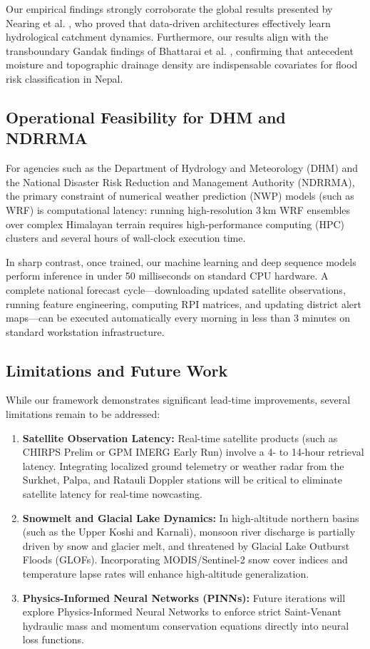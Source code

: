\documentclass[journal]{IEEEtran}
\begin{document}
Our empirical findings strongly corroborate the global results presented by Nearing et al. \cite{nearing2024global}, who proved that data-driven architectures effectively learn hydrological catchment dynamics. Furthermore, our results align with the transboundary Gandak findings of Bhattarai et al. \cite{bhattarai2024leveraging}, confirming that antecedent moisture and topographic drainage density are indispensable covariates for flood risk classification in Nepal.

\subsection{Operational Feasibility for DHM and NDRRMA}
For agencies such as the Department of Hydrology and Meteorology (DHM) and the National Disaster Risk Reduction and Management Authority (NDRRMA), the primary constraint of numerical weather prediction (NWP) models (such as WRF) is computational latency: running high-resolution 3\,km WRF ensembles over complex Himalayan terrain requires high-performance computing (HPC) clusters and several hours of wall-clock execution time. 

In sharp contrast, once trained, our machine learning and deep sequence models perform inference in under 50 milliseconds on standard CPU hardware. A complete national forecast cycle---downloading updated satellite observations, running feature engineering, computing RPI matrices, and updating district alert maps---can be executed automatically every morning in less than 3 minutes on standard workstation infrastructure.

\subsection{Limitations and Future Work}
While our framework demonstrates significant lead-time improvements, several limitations remain to be addressed:
\begin{enumerate}
    \item \textbf{Satellite Observation Latency:} Real-time satellite products (such as CHIRPS Prelim or GPM IMERG Early Run) involve a 4- to 14-hour retrieval latency. Integrating localized ground telemetry or weather radar from the Surkhet, Palpa, and Ratauli Doppler stations will be critical to eliminate satellite latency for real-time nowcasting.
    \item \textbf{Snowmelt and Glacial Lake Dynamics:} In high-altitude northern basins (such as the Upper Koshi and Karnali), monsoon river discharge is partially driven by snow and glacier melt, and threatened by Glacial Lake Outburst Floods (GLOFs). Incorporating MODIS/Sentinel-2 snow cover indices and temperature lapse rates will enhance high-altitude generalization.
    \item \textbf{Physics-Informed Neural Networks (PINNs):} Future iterations will explore Physics-Informed Neural Networks to enforce strict Saint-Venant hydraulic mass and momentum conservation equations directly into neural loss functions.
\end{enumerate}
\end{document}
